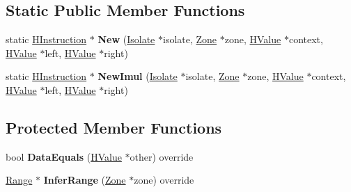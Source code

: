 \subsection*{Static Public Member Functions}
\begin{DoxyCompactItemize}
\item 
static \hyperlink{classv8_1_1internal_1_1_h_instruction}{H\+Instruction} $\ast$ {\bfseries New} (\hyperlink{classv8_1_1internal_1_1_isolate}{Isolate} $\ast$isolate, \hyperlink{classv8_1_1internal_1_1_zone}{Zone} $\ast$zone, \hyperlink{classv8_1_1internal_1_1_h_value}{H\+Value} $\ast$context, \hyperlink{classv8_1_1internal_1_1_h_value}{H\+Value} $\ast$left, \hyperlink{classv8_1_1internal_1_1_h_value}{H\+Value} $\ast$right)\hypertarget{classv8_1_1internal_1_1_h_mul_ab5fb478b064072ac0356d71d6ba62a61}{}\label{classv8_1_1internal_1_1_h_mul_ab5fb478b064072ac0356d71d6ba62a61}

\item 
static \hyperlink{classv8_1_1internal_1_1_h_instruction}{H\+Instruction} $\ast$ {\bfseries New\+Imul} (\hyperlink{classv8_1_1internal_1_1_isolate}{Isolate} $\ast$isolate, \hyperlink{classv8_1_1internal_1_1_zone}{Zone} $\ast$zone, \hyperlink{classv8_1_1internal_1_1_h_value}{H\+Value} $\ast$context, \hyperlink{classv8_1_1internal_1_1_h_value}{H\+Value} $\ast$left, \hyperlink{classv8_1_1internal_1_1_h_value}{H\+Value} $\ast$right)\hypertarget{classv8_1_1internal_1_1_h_mul_a1a8d6212d04fc9291042037255af2c0a}{}\label{classv8_1_1internal_1_1_h_mul_a1a8d6212d04fc9291042037255af2c0a}

\end{DoxyCompactItemize}
\subsection*{Protected Member Functions}
\begin{DoxyCompactItemize}
\item 
bool {\bfseries Data\+Equals} (\hyperlink{classv8_1_1internal_1_1_h_value}{H\+Value} $\ast$other) override\hypertarget{classv8_1_1internal_1_1_h_mul_a7bff016bdf3d74660a4120ee4a86264d}{}\label{classv8_1_1internal_1_1_h_mul_a7bff016bdf3d74660a4120ee4a86264d}

\item 
\hyperlink{classv8_1_1internal_1_1_range}{Range} $\ast$ {\bfseries Infer\+Range} (\hyperlink{classv8_1_1internal_1_1_zone}{Zone} $\ast$zone) override\hypertarget{classv8_1_1internal_1_1_h_mul_a6070b888444c8d29229701648d0efa66}{}\label{classv8_1_1internal_1_1_h_mul_a6070b888444c8d29229701648d0efa66}

\end{DoxyCompactItemize}

